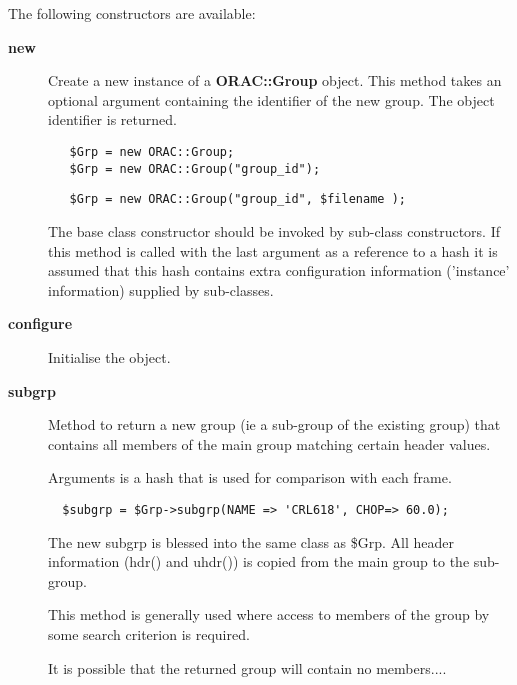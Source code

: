 \begin{description}
The following constructors are available:

\begin{description}

\item[{\textbf{new}}] \mbox{}

Create a new instance of a \textbf{ORAC::Group} object.
This method takes an optional argument containing the
identifier of the new group. The object identifier is returned.

\begin{verbatim}
   $Grp = new ORAC::Group;
   $Grp = new ORAC::Group("group_id");
\end{verbatim}
\begin{verbatim}
   $Grp = new ORAC::Group("group_id", $filename );
\end{verbatim}


The base class constructor should be invoked by sub-class constructors.
If this method is called with the last argument as a reference to
a hash it is assumed that this hash contains extra configuration
information ('instance' information) supplied by sub-classes.


\item[{\textbf{configure}}] \mbox{}

Initialise the object.


\item[{\textbf{subgrp}}] \mbox{}

Method to return a new group (ie a sub-group of the existing
group) that contains all members of the main group matching
certain header values.



Arguments is a hash that is used for comparison with each
frame.

\begin{verbatim}
  $subgrp = $Grp->subgrp(NAME => 'CRL618', CHOP=> 60.0);
\end{verbatim}


The new subgrp is blessed into the same class as \$Grp.
All header information (hdr() and uhdr()) is copied
from the main group to the sub-group.



This method is generally used where access to members of the
group by some search criterion is required.



It is possible that the returned group will contain no
members....




\end{description}
\end{description}
